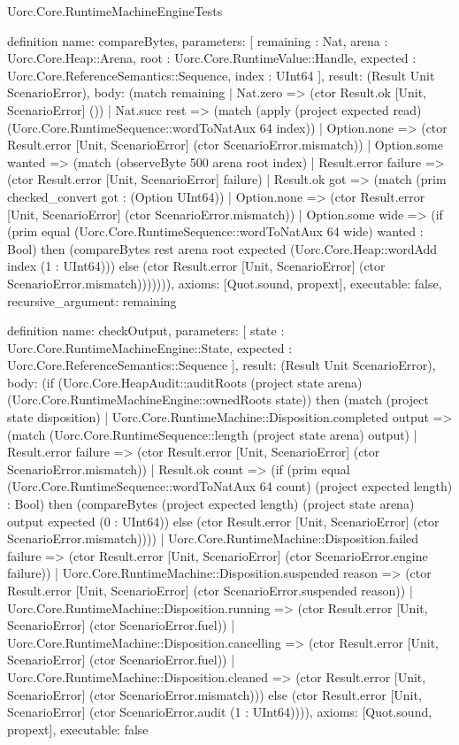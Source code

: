 \begin{lexlean}{Uorc.Core.RuntimeMachineEngineTests}
\begin{semanticmodule}
definition{
  name: compareBytes,
  parameters: [
    remaining : Nat,
    arena : Uorc.Core.Heap::Arena,
    root : Uorc.Core.RuntimeValue::Handle,
    expected : Uorc.Core.ReferenceSemantics::Sequence,
    index : UInt64
  ],
  result: (Result Unit ScenarioError),
  body: (match remaining
    | Nat.zero => (ctor Result.ok [Unit, ScenarioError] ())
    | Nat.succ rest => (match (apply (project expected read) (Uorc.Core.RuntimeSequence::wordToNatAux 64 index))
      | Option.none => (ctor Result.error [Unit, ScenarioError] (ctor ScenarioError.mismatch))
      | Option.some wanted => (match (observeByte 500 arena root index)
        | Result.error failure => (ctor Result.error [Unit, ScenarioError] failure)
        | Result.ok got => (match (prim checked_convert got : (Option UInt64))
          | Option.none => (ctor Result.error [Unit, ScenarioError] (ctor ScenarioError.mismatch))
          | Option.some wide => (if (prim equal (Uorc.Core.RuntimeSequence::wordToNatAux 64 wide) wanted : Bool) then (compareBytes rest arena root expected (Uorc.Core.Heap::wordAdd index (1 : UInt64))) else (ctor Result.error [Unit, ScenarioError] (ctor ScenarioError.mismatch))))))),
  axioms: [Quot.sound, propext],
  executable: false,
  recursive_argument: remaining
}

definition{
  name: checkOutput,
  parameters: [
    state : Uorc.Core.RuntimeMachineEngine::State,
    expected : Uorc.Core.ReferenceSemantics::Sequence
  ],
  result: (Result Unit ScenarioError),
  body: (if (Uorc.Core.HeapAudit::auditRoots (project state arena) (Uorc.Core.RuntimeMachineEngine::ownedRoots state)) then (match (project state disposition)
    | Uorc.Core.RuntimeMachine::Disposition.completed output => (match (Uorc.Core.RuntimeSequence::length (project state arena) output)
      | Result.error failure => (ctor Result.error [Unit, ScenarioError] (ctor ScenarioError.mismatch))
      | Result.ok count => (if (prim equal (Uorc.Core.RuntimeSequence::wordToNatAux 64 count) (project expected length) : Bool) then (compareBytes (project expected length) (project state arena) output expected (0 : UInt64)) else (ctor Result.error [Unit, ScenarioError] (ctor ScenarioError.mismatch))))
    | Uorc.Core.RuntimeMachine::Disposition.failed failure => (ctor Result.error [Unit, ScenarioError] (ctor ScenarioError.engine failure))
    | Uorc.Core.RuntimeMachine::Disposition.suspended reason => (ctor Result.error [Unit, ScenarioError] (ctor ScenarioError.suspended reason))
    | Uorc.Core.RuntimeMachine::Disposition.running => (ctor Result.error [Unit, ScenarioError] (ctor ScenarioError.fuel))
    | Uorc.Core.RuntimeMachine::Disposition.cancelling => (ctor Result.error [Unit, ScenarioError] (ctor ScenarioError.fuel))
    | Uorc.Core.RuntimeMachine::Disposition.cleaned => (ctor Result.error [Unit, ScenarioError] (ctor ScenarioError.mismatch))) else (ctor Result.error [Unit, ScenarioError] (ctor ScenarioError.audit (1 : UInt64)))),
  axioms: [Quot.sound, propext],
  executable: false
}


\end{semanticmodule}
\end{lexlean}
